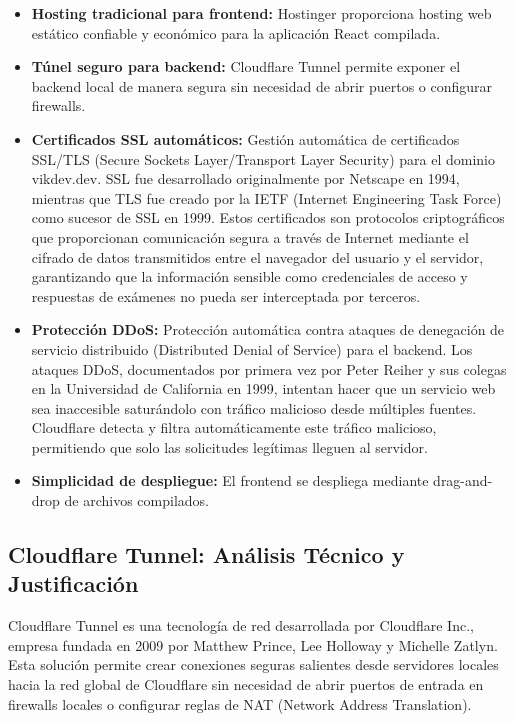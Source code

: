 \documentclass[12pt,a4paper]{report}
\begin{document}
\begin{itemize}
\item \textbf{Hosting tradicional para frontend:} Hostinger proporciona hosting web estático confiable y económico para la aplicación React compilada.
\item \textbf{Túnel seguro para backend:} Cloudflare Tunnel permite exponer el backend local de manera segura sin necesidad de abrir puertos o configurar firewalls.
\item \textbf{Certificados SSL automáticos:} Gestión automática de certificados SSL/TLS (Secure Sockets Layer/Transport Layer Security) para el dominio vikdev.dev. SSL fue desarrollado originalmente por Netscape en 1994, mientras que TLS fue creado por la IETF (Internet Engineering Task Force) como sucesor de SSL en 1999. Estos certificados son protocolos criptográficos que proporcionan comunicación segura a través de Internet mediante el cifrado de datos transmitidos entre el navegador del usuario y el servidor, garantizando que la información sensible como credenciales de acceso y respuestas de exámenes no pueda ser interceptada por terceros.
\item \textbf{Protección DDoS:} Protección automática contra ataques de denegación de servicio distribuido (Distributed Denial of Service) para el backend. Los ataques DDoS, documentados por primera vez por Peter Reiher y sus colegas en la Universidad de California en 1999, intentan hacer que un servicio web sea inaccesible saturándolo con tráfico malicioso desde múltiples fuentes. Cloudflare detecta y filtra automáticamente este tráfico malicioso, permitiendo que solo las solicitudes legítimas lleguen al servidor.
\item \textbf{Simplicidad de despliegue:} El frontend se despliega mediante drag-and-drop de archivos compilados.
\end{itemize}

\subsection{Cloudflare Tunnel: Análisis Técnico y Justificación}

Cloudflare Tunnel es una tecnología de red desarrollada por Cloudflare Inc., empresa fundada en 2009 por Matthew Prince, Lee Holloway y Michelle Zatlyn. Esta solución permite crear conexiones seguras salientes desde servidores locales hacia la red global de Cloudflare sin necesidad de abrir puertos de entrada en firewalls locales o configurar reglas de NAT (Network Address Translation).
\end{document}
